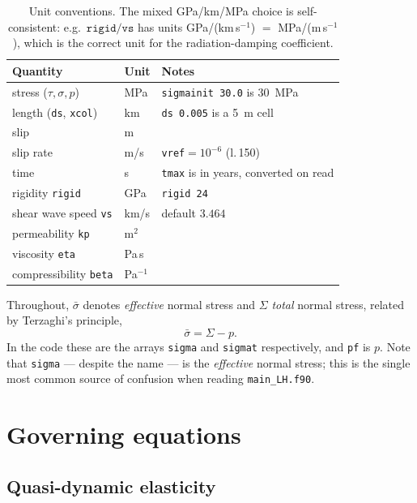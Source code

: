 \documentclass[11pt]{article}
\newcommand{\code}[1]{\texttt{#1}}
\newcommand{\sigeff}{\bar{\sigma}}
\newcommand{\sigtot}{\Sigma}
\begin{document}
\begin{table}[h]
\centering
\begin{tabular}{lll}
\toprule
Quantity & Unit & Notes \\
\midrule
stress ($\tau,\sigma,p$)         & MPa   & \code{sigmainit 30.0} is 30~MPa \\
length (\code{ds}, \code{xcol})  & km    & \code{ds 0.005} is a 5~m cell \\
slip                              & m     & \\
slip rate                         & m/s   & \code{vref}$=10^{-6}$ (l.\,150) \\
time                              & s     & \code{tmax} is in years, converted on read \\
rigidity \code{rigid}             & GPa   & \code{rigid 24} \\
shear wave speed \code{vs}        & km/s  & default $3.464$ \\
permeability \code{kp}            & m$^2$ & \\
viscosity \code{eta}              & Pa\,s & \\
compressibility \code{beta}       & Pa$^{-1}$ & \\
\bottomrule
\end{tabular}
\caption{Unit conventions. The mixed GPa/km/MPa choice is self-consistent:
e.g.\ $\code{rigid}/\code{vs}$ has units GPa/(km\,s$^{-1}$) $=$
MPa/(m\,s$^{-1}$), which is the correct unit for the radiation-damping
coefficient.}
\label{tab:units}
\end{table}

Throughout, $\sigeff$ denotes \emph{effective} normal stress and $\sigtot$
\emph{total} normal stress, related by Terzaghi's principle,
\begin{equation}
  \sigeff = \sigtot - p .
  \label{eq:terzaghi}
\end{equation}
In the code these are the arrays \code{sigma} and \code{sigmat} respectively,
and \code{pf} is $p$. Note that \code{sigma} --- despite the name --- is the
\emph{effective} normal stress; this is the single most common source of
confusion when reading \code{main\_LH.f90}.

\section{Governing equations}

\subsection{Quasi-dynamic elasticity}
\end{document}
